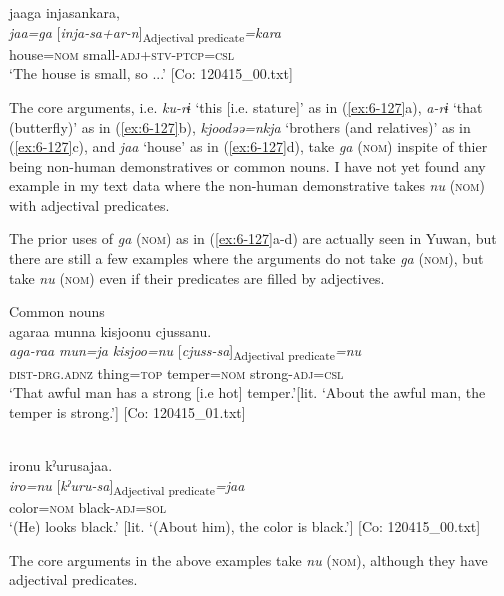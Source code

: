 \ex
{\TM}
\glll jaaga  injasankara,\\
\textit{jaa=ga}  [\textit{inja-sa+ar-n}]\textsubscript{Adjectival predicate}\textit{=kara}\\
house=\textsc{nom}  small-\textsc{adj}+\textsc{stv}-\textsc{ptcp}=\textsc{csl}\\
\glt ‘The house is small, so ...’ [Co: 120415\_00.txt]
\z
\z


The core arguments, i.e. \textit{ku-rɨ} ‘this [i.e. stature]’ as in (\ref{ex:6-127}a), \textit{a-rɨ} ‘that (butterfly)’ as in (\ref{ex:6-127}b), \textit{kjoodəə=nkja} ‘brothers (and relatives)’ as in (\ref{ex:6-127}c), and \textit{jaa} ‘house’ as in (\ref{ex:6-127}d), take \textit{ga} (\textsc{nom}) inspite of thier being non-human demonstratives or common nouns. I have not yet found any example in my text data where the non-human demonstrative takes \textit{nu} (\textsc{nom}) with adjectival predicates.

The prior uses of \textit{ga} (\textsc{nom}) as in (\ref{ex:6-127}a-d) are actually seen in Yuwan, but there are still a few examples where the arguments do not take \textit{ga} (\textsc{nom}), but take \textit{nu} (\textsc{nom}) even if their predicates are filled by adjectives.

\ea\label{ex:6-128}
 Common nouns\\

 \ea
 {\TM}
\glll  agaraa  munna  kisjoonu  cjussanu.\\
\textit{aga-raa}  \textit{mun=ja}  \textit{kisjoo=nu}  [\textit{cjuss-sa}]\textsubscript{Adjectival predicate}\textit{=nu}\\
\textsc{dist}-\textsc{drg}.\textsc{adnz}  thing=\textsc{top}  temper=\textsc{nom}  strong-\textsc{adj}=\textsc{csl}\\
\glt ‘That awful man has a strong [i.e hot] temper.’[lit. ‘About the awful man, the temper is strong.’]      [Co: 120415\_01.txt]

\ex{}\\
{\TM}
\glll  {\textbar}iro{\textbar}nu  kˀurusajaa.\\
\textit{iro=nu}  [\textit{kˀuru-sa}]\textsubscript{Adjectival predicate}\textit{=jaa}\\
color=\textsc{nom}  black-\textsc{adj}=\textsc{sol}\\
\glt ‘(He) looks black.’ [lit. ‘(About him), the color is black.’]     [Co: 120415\_00.txt]
\z
\z

The core arguments in the above examples take \textit{nu} (\textsc{nom}), although they have adjectival predicates.

